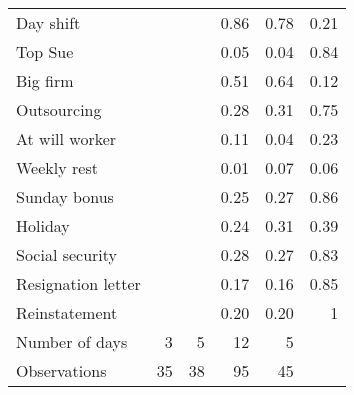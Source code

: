\begin{tabular}{lrrrrc}
Day shift &       &       & 0.86  & 0.78  & \multicolumn{1}{r}{0.21} \\
Top Sue &       &       & 0.05  & 0.04  & \multicolumn{1}{r}{0.84} \\
Big firm &       &       & 0.51  & 0.64  & \multicolumn{1}{r}{0.12} \\
Outsourcing  &       &       & 0.28  & 0.31  & \multicolumn{1}{r}{0.75} \\
At will worker &       &       & 0.11  & 0.04  & \multicolumn{1}{r}{0.23} \\
Weekly rest &       &       & 0.01  & 0.07  & \multicolumn{1}{r}{0.06} \\
Sunday bonus &       &       & 0.25  & 0.27  & \multicolumn{1}{r}{0.86} \\
Holiday &       &       & 0.24  & 0.31  & \multicolumn{1}{r}{0.39} \\
Social security &       &       & 0.28  & 0.27  & \multicolumn{1}{r}{0.83} \\
Resignation letter &       &       & 0.17  & 0.16  & \multicolumn{1}{r}{0.85} \\
Reinstatement &       &       & 0.20  & 0.20  & \multicolumn{1}{r}{1} \\
Number of days & 3     & 5     & 12    & 5     &  \\
\midrule
Observations & 35    & 38    & 95    & 45    &  \\
\bottomrule
\bottomrule
\end{tabular}%

